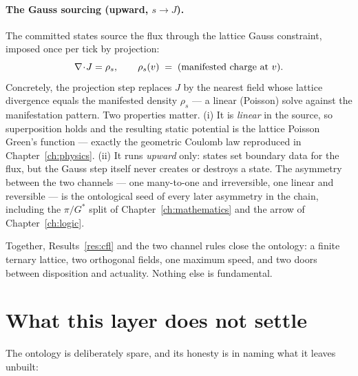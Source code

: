 \paragraph{The Gauss sourcing (upward, $s\to J$).} The committed states source the
flux through the lattice Gauss constraint, imposed once per tick by projection:
\[
  \nabla\!\cdot\!J = \rho_s ,
  \qquad \rho_s(v) \;=\; \text{(manifested charge at $v$)} .
\]
Concretely, the projection step replaces $J$ by the nearest field whose lattice
divergence equals the manifested density $\rho_s$ --- a linear (Poisson) solve
against the manifestation pattern. Two properties matter. (i) It is \emph{linear}
in the source, so superposition holds and the resulting static potential is the
lattice Poisson Green's function --- exactly the geometric Coulomb law reproduced
in Chapter~\ref{ch:physics}. (ii) It runs \emph{upward} only: states set boundary
data for the flux, but the Gauss step itself never creates or destroys a state.
The asymmetry between the two channels --- one many-to-one and irreversible, one
linear and reversible --- is the ontological seed of every later asymmetry in the
chain, including the $\pi/G^{*}$ split of Chapter~\ref{ch:mathematics} and the
arrow of Chapter~\ref{ch:logic}.

Together, Results~\ref{res:cfl} and the two channel rules close the ontology: a
finite ternary lattice, two orthogonal fields, one maximum speed, and two doors
between disposition and actuality. Nothing else is fundamental.

\section{What this layer does not settle}\label{sec:ontology-open}

The ontology is deliberately spare, and its honesty is in naming what it leaves
unbuilt:

